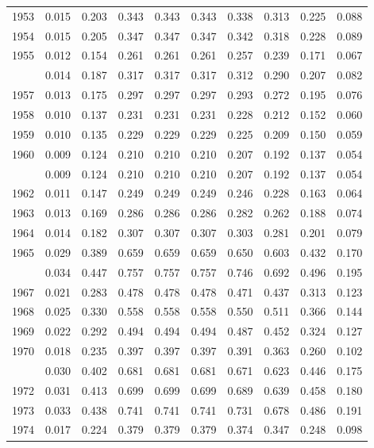 \documentclass[
]{article}
\begin{document}
\begin{longtable}[t]{lrrrrrrrrr}
1953 & 0.015 & 0.203 & 0.343 & 0.343 & 0.343 & 0.338 & 0.313 & 0.225 & 0.088\\
1954 & 0.015 & 0.205 & 0.347 & 0.347 & 0.347 & 0.342 & 0.318 & 0.228 & 0.089\\
1955 & 0.012 & 0.154 & 0.261 & 0.261 & 0.261 & 0.257 & 0.239 & 0.171 & 0.067\\
\addlinespace
1956 & 0.014 & 0.187 & 0.317 & 0.317 & 0.317 & 0.312 & 0.290 & 0.207 & 0.082\\
1957 & 0.013 & 0.175 & 0.297 & 0.297 & 0.297 & 0.293 & 0.272 & 0.195 & 0.076\\
1958 & 0.010 & 0.137 & 0.231 & 0.231 & 0.231 & 0.228 & 0.212 & 0.152 & 0.060\\
1959 & 0.010 & 0.135 & 0.229 & 0.229 & 0.229 & 0.225 & 0.209 & 0.150 & 0.059\\
1960 & 0.009 & 0.124 & 0.210 & 0.210 & 0.210 & 0.207 & 0.192 & 0.137 & 0.054\\
\addlinespace
1961 & 0.009 & 0.124 & 0.210 & 0.210 & 0.210 & 0.207 & 0.192 & 0.137 & 0.054\\
1962 & 0.011 & 0.147 & 0.249 & 0.249 & 0.249 & 0.246 & 0.228 & 0.163 & 0.064\\
1963 & 0.013 & 0.169 & 0.286 & 0.286 & 0.286 & 0.282 & 0.262 & 0.188 & 0.074\\
1964 & 0.014 & 0.182 & 0.307 & 0.307 & 0.307 & 0.303 & 0.281 & 0.201 & 0.079\\
1965 & 0.029 & 0.389 & 0.659 & 0.659 & 0.659 & 0.650 & 0.603 & 0.432 & 0.170\\
\addlinespace
1966 & 0.034 & 0.447 & 0.757 & 0.757 & 0.757 & 0.746 & 0.692 & 0.496 & 0.195\\
1967 & 0.021 & 0.283 & 0.478 & 0.478 & 0.478 & 0.471 & 0.437 & 0.313 & 0.123\\
1968 & 0.025 & 0.330 & 0.558 & 0.558 & 0.558 & 0.550 & 0.511 & 0.366 & 0.144\\
1969 & 0.022 & 0.292 & 0.494 & 0.494 & 0.494 & 0.487 & 0.452 & 0.324 & 0.127\\
1970 & 0.018 & 0.235 & 0.397 & 0.397 & 0.397 & 0.391 & 0.363 & 0.260 & 0.102\\
\addlinespace
1971 & 0.030 & 0.402 & 0.681 & 0.681 & 0.681 & 0.671 & 0.623 & 0.446 & 0.175\\
1972 & 0.031 & 0.413 & 0.699 & 0.699 & 0.699 & 0.689 & 0.639 & 0.458 & 0.180\\
1973 & 0.033 & 0.438 & 0.741 & 0.741 & 0.741 & 0.731 & 0.678 & 0.486 & 0.191\\
1974 & 0.017 & 0.224 & 0.379 & 0.379 & 0.379 & 0.374 & 0.347 & 0.248 & 0.098\\

\end{longtable}
\end{document}
